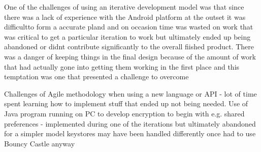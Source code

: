 One of the challenges of using an iterative development model was that since there was a lack of experience with the Android platform at the outset it was difficultto form a accurate pland and on occasion time was wasted on work that was critical to get a particular iteration to work but ultimately ended up being abandoned or didnt contribute significantly to the overall fiished product.  There was a danger of keeping things in the final design because of the amount of work that had actually gone into getting them working in the first place and this temptation was one that presented a challenge to overcome

Challenges of Agile methodology when using a new language or API - lot of time spent learning how to implement stuff that ended up not being needed.
Use of Java program running on PC to develop encryption to begin with
e.g. shared preferences - implemented during one of the iterations but ultimately abandoned for a simpler model
keystores may have been handled differently once had to use Bouncy Castle anyway

